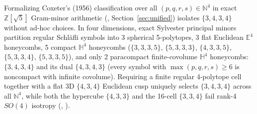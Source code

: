 Formalizing Coxeter's (1956) classification over all $(p, q, r, s) \in \mathbb{N}^4$ in exact $\mathbb{Z}[\sqrt{5}]$
Gram-minor arithmetic (, Section~\ref{sec:unified}) isolates $\{3,4,3,4\}$ without ad-hoc
choices. In four dimensions, exact Sylvester principal minors partition regular Schl\"afli symbols into 3 spherical
5-polytopes, 3 flat Euclidean $\mathbb{E}^4$ honeycombs, 5 compact $\mathbb{H}^4$ honeycombs ($\{3,3,3,5\}$,
$\{5,3,3,3\}$, $\{4,3,3,5\}$, $\{5,3,3,4\}$, $\{5,3,3,5\}$), and only 2 paracompact finite-covolume $\mathbb{H}^4$
honeycombs: $\{3,4,3,4\}$ and its dual $\{4,3,4,3\}$ (every symbol with $\max(p,q,r,s) \ge 6$ is noncompact with
infinite covolume). Requiring a finite regular 4-polytope cell together with a flat 3D $\{4,3,4\}$ Euclidean cusp
uniquely selects $\{3,4,3,4\}$ across all $\mathbb{N}^4$, while both the hypercube $\{4,3,3\}$ and the 16-cell
$\{3,3,4\}$ fail rank-4 $SO(4)$ isotropy (, ).

